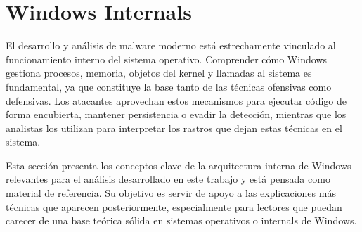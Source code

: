 \section{Windows Internals}

El desarrollo y análisis de malware moderno está estrechamente vinculado al funcionamiento interno del sistema operativo. Comprender cómo Windows gestiona procesos, memoria, objetos del kernel y llamadas al sistema es fundamental, ya que constituye la base tanto de las técnicas ofensivas como defensivas. Los atacantes aprovechan estos mecanismos para ejecutar código de forma encubierta, mantener persistencia o evadir la detección, mientras que los analistas los utilizan para interpretar los rastros que dejan estas técnicas en el sistema.

Esta sección presenta los conceptos clave de la arquitectura interna de Windows relevantes para el análisis desarrollado en este trabajo y está pensada como material de referencia. Su objetivo es servir de apoyo a las explicaciones más técnicas que aparecen posteriormente, especialmente para lectores que puedan carecer de una base teórica sólida en sistemas operativos o internals de Windows.


\newpage

\newpage

\newpage

\newpage

\newpage

